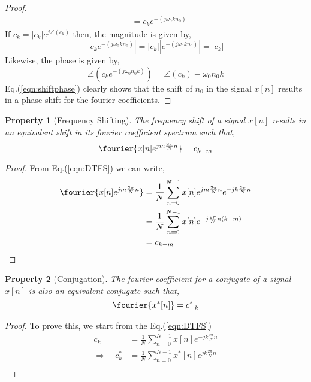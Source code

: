 \documentclass{home_assignment}
\newtheorem{theorem}{Property}
\begin{document}
{\begin{proof}
\begin{equation*}
\begin{aligned}
&=c_{k}e^{-\left(j \omega_{0} k n_0\right)}
\end{aligned}
\end{equation*}
If $c_{k}=\left|c_{k}\right| e^{j \angle\left(c_{k}\right)}$ then, the magnitude is given by, 
\begin{equation}
\left|c_ke^{-\left(j \omega_{0} k n_{0}\right)}\right|=\left|c_{k}\right|\left|e^{-\left(j \omega_{0} k n_{0}\right)}\right|=\left|c_{k}\right|
\label{eqn:shiftmag}
\end{equation}
Likewise, the phase is given by, 
\begin{equation}
\angle\left(c_ke^{-\left(j \omega_{0} n_{0} k\right)}\right)=\angle\left(c_{k}\right)-\omega_{0} n_{0} k 
\label{eqn:shiftphase}
\end{equation}
Eq.(\ref{eqn:shiftphase}) clearly shows that the shift of $n_0$ in the signal $x[n]$ results in a phase shift for the fourier coefficients.
\end{proof}
\begin{theorem}[Frequency Shifting]
The frequency shift of a signal $x[n]$ results in an equivalent shift in its fourier coefficient spectrum such that,
\begin{equation*}
\fourier{x[n]e^{jm\frac{2\pi}{N}n}}=c_{k-m}
\end{equation*}
\end{theorem}
\begin{proof}
From Eq.(\ref{eqn:DTFS}) we can write,
\begin{equation*}
\begin{aligned}
\fourier{x[n]e^{jm\frac{2\pi}{N}n}}&=\frac{1}{N}\sum_{n=0}^{N-1}x[n]e^{jm\frac{2\pi}{N}n}e^{-jk\frac{2\pi}{N}n}\\
&=\frac{1}{N}\sum_{n=0}^{N-1}x[n]e^{-j\frac{2\pi}{N}n(k-m)}\\
&=c_{k-m}
\end{aligned}
\end{equation*}
\end{proof}
\begin{theorem}[Conjugation]
The fourier coefficient for a conjugate of a signal $x[n]$ is also an equivalent conjugate such that,
$$
\fourier{x^*[n]}=c^*_{-k}
$$
\end{theorem}
\begin{proof}
To prove this, we start from the Eq.(\ref{eqn:DTFS})
$$
\begin{aligned}
c_k&=\frac{1}{N}\sum_{n=0}^{N-1}x[n]e^{-jk\frac{2\pi}{N}n}\\
\Rightarrow \quad c^*_k&=\frac{1}{N}\sum_{n=0}^{N-1}x^*[n]e^{jk\frac{2\pi}{N}n}\\

\end{aligned}$$
\end{proof}}
\end{document}
